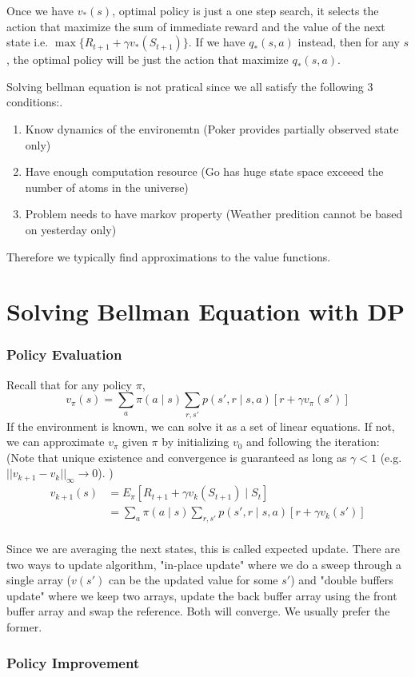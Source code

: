\documentclass[twocolumn, 10pt]{article}
\begin{document}
Once we have $v_*(s)$, optimal policy is just a one step search, it selects the action that maximize the sum of immediate reward and the value of the next state i.e.  $\max\{R_{t+1} + \gamma v_*(S_{t+1})\}$.  If we have $q_*(s, a)$ instead, then for any $s$,  the optimal policy will be just the action that maximize $q_*(s, a)$.

Solving bellman equation is not pratical since we all satisfy the following 3 conditions:.
\begin{enumerate}
  \item Know dynamics of the environemtn (Poker provides partially observed state only)
 \item  Have  enough computation resource (Go has huge state space exceeed the number of atoms in the universe)
 \item  Problem needs to have markov property (Weather predition cannot be based on yesterday only)
\end{enumerate}
 Therefore we typically find approximations to the value functions.
 
 \section*{Solving Bellman Equation with DP}
 
 \subsubsection*{Policy Evaluation}
 Recall that for any policy $\pi$,  $$v_{\pi} (s)  = \sum_{a} \pi(a \mid s)  \sum_{r, s'}   p(s', r \mid s, a)   \left[ r  + \gamma v_{\pi}(s')  \right]$$
 If the environment is known, we can solve it as a set of linear equations. If not, we can approximate $v_{\pi}$ given $\pi$ by initializing $v_0$ and following the iteration: (Note that unique existence and convergence is guaranteed as long as $\gamma < 1$ (e.g.  $||v_{k+1} - v_k||_\infty \rightarrow 0$). )
 $$ \begin{aligned}
  v_{k+1} (s)  &= E_{\pi} [R_{t+1} + \gamma v_k(S_{t+1}) \mid S_t]  \\
                       &=  \sum_{a} \pi(a \mid s)  \sum_{r, s'}   p(s', r \mid s, a)   \left[ r  + \gamma v_{k}(s')  \right] \\
 \end{aligned}$$
  
  Since we are averaging the next states, this is called expected update. There are two ways to update algorithm, "in-place update" where we do a sweep through a single array ($v(s')$ can be the updated value for some $s'$) and "double buffers update" where we keep two arrays, update the back buffer array using the front buffer array and swap the reference. Both will converge. We usually prefer the former.
  
 \subsubsection*{Policy Improvement}
 
 
\end{document}
